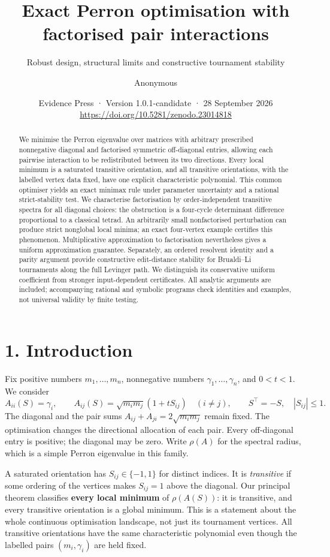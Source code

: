 \documentclass[
  11pt,
  a4paper,
]{article}
\title{Exact Perron optimisation with factorised pair interactions}
\subtitle{Robust design, structural limits and constructive tournament
stability}
\author{Anonymous}
\date{Evidence Press · Version 1.0.1-candidate · 28 September 2026\\\small\url{https://doi.org/10.5281/zenodo.23014818}}
\begin{document}
\maketitle
\begin{abstract}
We minimise the Perron eigenvalue over matrices with arbitrary
prescribed nonnegative diagonal and factorised symmetric off-diagonal
entries, allowing each pairwise interaction to be redistributed between
its two directions. Every local minimum is a saturated transitive
orientation, and all transitive orientations, with the labelled vertex
data fixed, have one explicit characteristic polynomial. This common
optimiser yields an exact minimax rule under parameter uncertainty and a
rational strict-stability test. We characterise factorisation by
order-independent transitive spectra for all diagonal choices: the
obstruction is a four-cycle determinant difference proportional to a
classical tetrad. An arbitrarily small nonfactorised perturbation can
produce strict nonglobal local minima; an exact four-vertex example
certifies this phenomenon. Multiplicative approximation to factorisation
nevertheless gives a uniform approximation guarantee. Separately, an
ordered resolvent identity and a parity argument provide constructive
edit-distance stability for Brualdi--Li tournaments along the full
Levinger path. We distinguish its conservative uniform coefficient from
stronger input-dependent certificates. All analytic arguments are
included; accompanying rational and symbolic programs check identities
and examples, not universal validity by finite testing.
\end{abstract}

\section{1. Introduction}\label{introduction}

Fix positive numbers \(m_1,\ldots,m_n\), nonnegative numbers
\(\gamma_1,\ldots,\gamma_n\), and \(0<t<1\). We consider \[
 A_{ii}(S)=\gamma_i,\qquad
 A_{ij}(S)=\sqrt{m_im_j}(1+tS_{ij})\quad(i\ne j),
 \qquad S^\top=-S,\quad |S_{ij}|\le1.                         \tag{1.1}
\] The diagonal and the pair sums \(A_{ij}+A_{ji}=2\sqrt{m_im_j}\)
remain fixed. The optimisation changes the directional allocation of
each pair. Every off-diagonal entry is positive; the diagonal may be
zero. Write \(\rho(A)\) for the spectral radius, which is a simple
Perron eigenvalue in this family.

A saturated orientation has \(S_{ij}\in\{-1,1\}\) for distinct indices.
It is \emph{transitive} if some ordering of the vertices makes
\(S_{ij}=1\) above the diagonal. Our principal theorem classifies
\textbf{every local minimum} of \(\rho(A(S))\): it is transitive, and
every transitive orientation is a global minimum. This is a statement
about the whole continuous optimisation landscape, not just its
tournament vertices. All transitive orientations have the same
characteristic polynomial even though the labelled pairs
\((m_i,\gamma_i)\) are held fixed.
\end{document}
